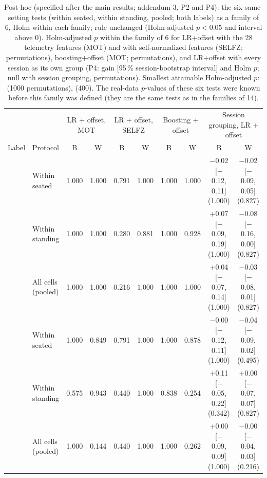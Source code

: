 \begin{table}[ht]
\centering
\scriptsize
\caption{Post hoc (specified after the main results; addendum 3, P2 and P4): the six same-setting tests (within seated, within standing, pooled; both labels) as a family of 6, Holm within each family; rule unchanged (Holm-adjusted $p<0.05$ and interval above 0). Holm-adjusted $p$ within the family of 6 for LR+offset with the 28 telemetry features (MOT) and with self-normalized features (SELFZ;  permutations), boosting+offset (MOT;  permutations), and LR+offset with every session as its own group (P4: gain [95\,\% session-bootstrap interval] and Holm $p$; null with session grouping,  permutations). Smallest attainable Holm-adjusted $p$:  (1000 permutations),  (400). The real-data $p$-values of these six tests were known before this family was defined (they are the same tests as in the families of 14).}
\label{tab:a3_family6}
\setlength{\tabcolsep}{2pt}
\begin{tabular}{@{}llcccccccc@{}}
\toprule
 & & \multicolumn{2}{c}{LR + offset, MOT} & \multicolumn{2}{c}{LR + offset, SELFZ} & \multicolumn{2}{c}{Boosting + offset} & \multicolumn{2}{c}{Session grouping, LR + offset} \\
\cmidrule(lr){3-4}\cmidrule(lr){5-6}\cmidrule(lr){7-8}\cmidrule(lr){9-10}
Label & Protocol & B & W & B & W & B & W & B & W \\
\midrule
\sevtwo{} & Within seated & 1.000 & 1.000 & 0.791 & 1.000 & 1.000 & 1.000 & $-$0.02 [$-$0.12, 0.11] (1.000) & $-$0.02 [$-$0.09, 0.05] (0.827) \\
 & Within standing & 1.000 & 1.000 & 0.280 & 0.881 & 1.000 & 0.928 & +0.07 [$-$0.09, 0.19] (1.000) & $-$0.08 [$-$0.16, 0.00] (0.827) \\
 & All cells (pooled) & 1.000 & 1.000 & 0.216 & 1.000 & 1.000 & 1.000 & +0.04 [$-$0.07, 0.14] (1.000) & $-$0.03 [$-$0.08, 0.01] (0.827) \\
\midrule
\sevone{} & Within seated & 1.000 & 0.849 & 0.791 & 1.000 & 1.000 & 0.878 & $-$0.00 [$-$0.12, 0.11] (1.000) & $-$0.04 [$-$0.09, 0.02] (0.495) \\
 & Within standing & 0.575 & 0.943 & 0.440 & 1.000 & 0.838 & 0.254 & +0.11 [$-$0.05, 0.22] (0.342) & +0.00 [$-$0.07, 0.07] (0.827) \\
 & All cells (pooled) & 1.000 & 0.144 & 0.440 & 1.000 & 1.000 & 0.262 & +0.00 [$-$0.09, 0.09] (1.000) & $-$0.00 [$-$0.04, 0.03] (0.216) \\
\bottomrule
\end{tabular}
\end{table}
